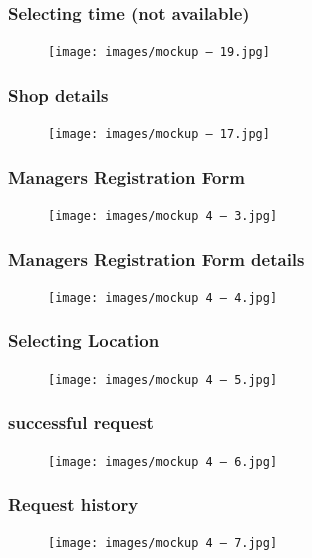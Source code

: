 \subsubsection{Selecting time (not available)}
\begin{figure}[H]
  \centering
  \texttt{[image: images/mockup – 19.jpg]}
\end{figure}

\subsubsection{Shop details}
\begin{figure}[H]
  \centering
  \texttt{[image: images/mockup – 17.jpg]}
\end{figure}

\subsubsection{Managers Registration Form}
\begin{figure}[H]
  \centering
  \texttt{[image: images/mockup 4 – 3.jpg]}
\end{figure}

\subsubsection{Managers Registration Form details}
\begin{figure}[H]
  \centering
  \texttt{[image: images/mockup 4 – 4.jpg]}
\end{figure}

\subsubsection{Selecting Location}
\begin{figure}[H]
  \centering
  \texttt{[image: images/mockup 4 – 5.jpg]}
\end{figure}

\subsubsection{successful request }
\begin{figure}[H]
  \centering
  \texttt{[image: images/mockup 4 – 6.jpg]}
\end{figure}

\subsubsection{Request history}
\begin{figure}[H]
  \centering
  \texttt{[image: images/mockup 4 – 7.jpg]}
\end{figure}



